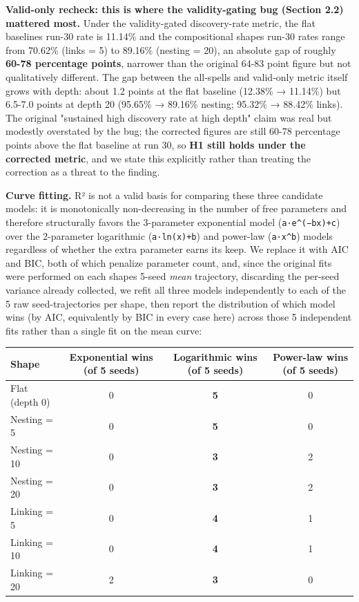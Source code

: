 \documentclass[
  10pt,
  twocolumn]{article}
\begin{document}
\textbf{Valid-only recheck: this is where the validity-gating bug
(Section 2.2) mattered most.} Under the validity-gated discovery-rate
metric, the flat baseline\textquotesingle s run-30 rate is 11.14\% and
the compositional shapes\textquotesingle{} run-30 rates range from
70.62\% (links = 5) to 89.16\% (nesting = 20), an absolute gap of
roughly \textbf{60-78 percentage points}, narrower than the original
64-83 point figure but not qualitatively different. The gap between the
all-spells and valid-only metric itself grows with depth: about 1.2
points at the flat baseline (12.38\% → 11.14\%) but 6.5-7.0 points at
depth 20 (95.65\% → 89.16\% nesting; 95.32\% → 88.42\% links). The
original "sustained high discovery rate at high depth" claim was real
but modestly overstated by the bug; the corrected figures are still
60-78 percentage points above the flat baseline at run 30, so \textbf{H1
still holds under the corrected metric}, and we state this explicitly
rather than treating the correction as a threat to the finding.

\textbf{Curve fitting.} R² is not a valid basis for comparing these
three candidate models: it is monotonically non-decreasing in the number
of free parameters and therefore structurally favors the 3-parameter
exponential model (\texttt{a·e\^{}(−bx)+c}) over the 2-parameter
logarithmic (\texttt{a·ln(x)+b}) and power-law (\texttt{a·x\^{}b})
models regardless of whether the extra parameter earns its keep. We
replace it with AIC and BIC, both of which penalize parameter count,
and, since the original fits were performed on each
shape\textquotesingle s 5-seed \emph{mean} trajectory, discarding the
per-seed variance already collected, we refit all three models
independently to each of the 5 raw seed-trajectories per shape, then
report the distribution of which model wins (by AIC, equivalently by BIC
in every case here) across those 5 independent fits rather than a single
fit on the mean curve:

\begin{table}[t]
\centering
\begin{tabular}{@{}lccc@{}}
\toprule
Shape & Exponential wins (of 5 seeds) & Logarithmic wins (of 5 seeds) &
Power-law wins (of 5 seeds) \\
\midrule
Flat (depth 0) & 0 & \textbf{5} & 0 \\
Nesting = 5 & 0 & \textbf{5} & 0 \\
Nesting = 10 & 0 & \textbf{3} & 2 \\
Nesting = 20 & 0 & \textbf{3} & 2 \\
Linking = 5 & 0 & \textbf{4} & 1 \\
Linking = 10 & 0 & \textbf{4} & 1 \\
Linking = 20 & 2 & \textbf{3} & 0 \\
\bottomrule
\end{tabular}
\end{table}
\end{document}
